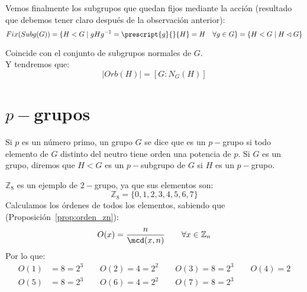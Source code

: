 Vemos finalmente los subgrupos que quedan fijos mediante la acción (resultado que debemos tener claro después de la observación anterior):
\begin{equation*}
    Fix(Subg(G)) = \{H < G \mid gHg^{-1} = \prescript{g}{}{H} = H \quad \forall g\in G\} = \{H< G \mid H\lhd G\}
\end{equation*}

Coincide con el conjunto de subgrupos normales de $G$.\\

\noindent
Y tendremos que:
\begin{equation*}
    |Orb(H)| = [G:N_G(H)]
\end{equation*}

\section{$p-$grupos}
\begin{definicion}[$p-$grupo]
    Si $p$ es un número primo, un grupo $G$ se dice que es un $p-$grupo si todo elemento de $G$ distinto del neutro tiene orden una potencia de $p$.\newline
    Si $G$ es un grupo, diremos que $H<G$ es un $p-$subgrupo de $G$ si $H$ es un $p-$grupo.
\end{definicion}

\begin{ejemplo}
    $\mathbb{Z}_8$ es un ejemplo de $2-$grupo, ya que sus elementos son:
    \begin{equation*}
        \mathbb{Z}_8 = \{0, 1, 2, 3, 4, 5, 6, 7\}
    \end{equation*}
    Calculamos los órdenes de todos los elementos,  sabiendo que (Proposición~\ref{prop:orden_zn}):
    \begin{equation*}
        O(x) = \dfrac{n}{\mcd(x,n)} \qquad \forall x\in \mathbb{Z}_n
    \end{equation*}
    Por lo que:
    \begin{align*}
        O(1) &= 8 = 2^{3} \qquad 
        O(2) = 4 = 2^2 \qquad 
        O(3) = 8 = 2^3 \qquad 
        O(4) = 2 \\
        O(5) &= 8 = 2^3 \qquad 
        O(6) = 4 = 2^2 \qquad 
        O(7) = 8 = 2^3
    \end{align*}
\end{ejemplo}

